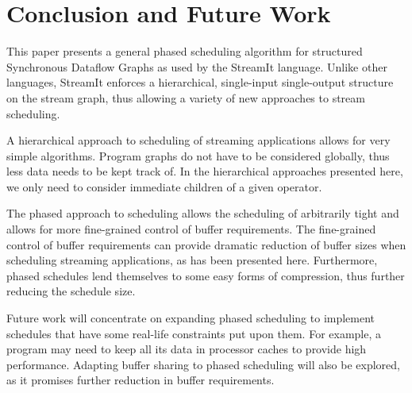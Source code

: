 \section{Conclusion and Future Work}
\label{chpt:conclusion}

This paper presents a general phased scheduling algorithm for
structured Synchronous Dataflow Graphs as used by the StreamIt
language.  Unlike other languages, StreamIt enforces a hierarchical,
single-input single-output structure on the stream graph, thus
allowing a variety of new approaches to stream scheduling.

A hierarchical approach to scheduling of streaming applications allows
for very simple algorithms. Program graphs do not have to be
considered globally, thus less data needs to be kept track of.  In the
hierarchical approaches presented here, we only need to consider
immediate children of a given operator.

The phased approach to scheduling allows the scheduling of arbitrarily
tight {\feedbackloops} and allows for more fine-grained control of
buffer requirements. The fine-grained control of buffer requirements
can provide dramatic reduction of buffer sizes when scheduling
streaming applications, as has been presented here. Furthermore,
phased schedules lend themselves to some easy forms of compression,
thus further reducing the schedule size.

Future work will concentrate on expanding phased scheduling to
implement schedules that have some real-life constraints put upon
them. For example, a program may need to keep all its data in
processor caches to provide high performance.  Adapting buffer sharing
to phased scheduling will also be explored, as it promises further
reduction in buffer requirements.
